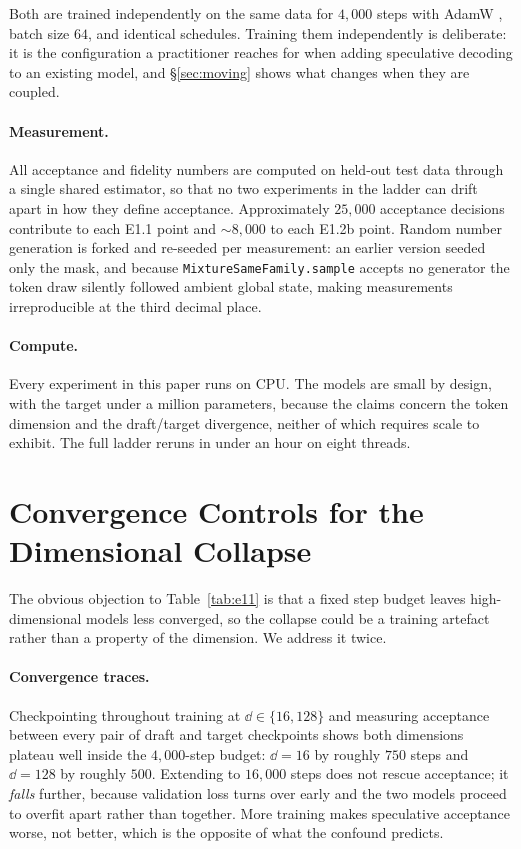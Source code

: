 Both are trained independently on the same data for $4{,}000$ steps with AdamW
\citep{loshchilov2019decoupled}, batch size $64$, and identical schedules. Training them independently
is deliberate: it is the configuration a practitioner reaches for when adding speculative decoding to
an existing model, and \S\ref{sec:moving} shows what changes when they are coupled.

\paragraph{Measurement.} All acceptance and fidelity numbers are computed on held-out test data
through a single shared estimator, so that no two experiments in the ladder can drift apart in how
they define acceptance. Approximately $25{,}000$ acceptance decisions contribute to each E1.1 point
and $\sim$$8{,}000$ to each E1.2b point. Random number generation is forked and re-seeded per
measurement: an earlier version seeded only the mask, and because \texttt{MixtureSameFamily.sample}
accepts no generator the token draw silently followed ambient global state, making measurements
irreproducible at the third decimal place.

\paragraph{Compute.} Every experiment in this paper runs on CPU. The models are small by design, with the
target under a million parameters, because the claims concern the token dimension and the
draft/target divergence, neither of which requires scale to exhibit. The full ladder reruns in under
an hour on eight threads.

\section{Convergence Controls for the Dimensional Collapse}
\label{app:convergence}

The obvious objection to Table~\ref{tab:e11} is that a fixed step budget leaves high-dimensional
models less converged, so the collapse could be a training artefact rather than a property of the
dimension. We address it twice.

\paragraph{Convergence traces.} Checkpointing throughout training at $\dd \in \{16, 128\}$ and
measuring acceptance between every pair of draft and target checkpoints shows both dimensions plateau
well inside the $4{,}000$-step budget: $\dd{=}16$ by roughly $750$ steps and $\dd{=}128$ by roughly
$500$. Extending to $16{,}000$ steps does not rescue acceptance; it \emph{falls} further, because
validation loss turns over early and the two models proceed to overfit apart rather than together.
More training makes speculative acceptance worse, not better, which is the opposite of what the
confound predicts.

